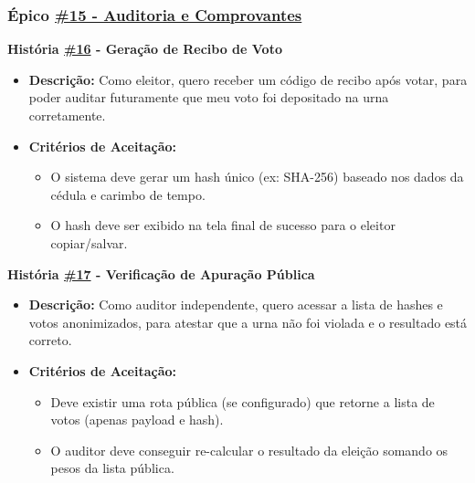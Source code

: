 \documentclass[12pt,a4paper]{article}
\begin{document}
\subsubsection*{Épico \href{https://github.com/gsscala/MC656/issues/15}{\#15 - Auditoria e Comprovantes}}
\textbf{História \href{https://github.com/gsscala/MC656/issues/16}{\#16} - Geração de Recibo de Voto}
\begin{itemize}
    \item \textbf{Descrição:} Como eleitor, quero receber um código de recibo após votar, para poder auditar futuramente que meu voto foi depositado na urna corretamente.
    \item \textbf{Critérios de Aceitação:}
    \begin{itemize}
        \item O sistema deve gerar um hash único (ex: SHA-256) baseado nos dados da cédula e carimbo de tempo.
        \item O hash deve ser exibido na tela final de sucesso para o eleitor copiar/salvar.
    \end{itemize}
\end{itemize}

\textbf{História \href{https://github.com/gsscala/MC656/issues/17}{\#17} - Verificação de Apuração Pública}
\begin{itemize}
    \item \textbf{Descrição:} Como auditor independente, quero acessar a lista de hashes e votos anonimizados, para atestar que a urna não foi violada e o resultado está correto.
    \item \textbf{Critérios de Aceitação:}
    \begin{itemize}
        \item Deve existir uma rota pública (se configurado) que retorne a lista de votos (apenas payload e hash).
        \item O auditor deve conseguir re-calcular o resultado da eleição somando os pesos da lista pública.
    \end{itemize}
\end{itemize}
\end{document}
